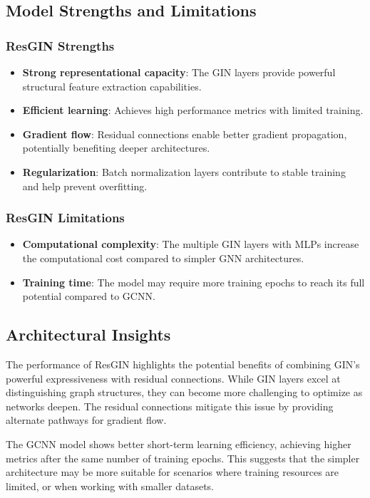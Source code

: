 \documentclass[conference]{IEEEtran}
\begin{document}
\subsection{Model Strengths and Limitations}

\subsubsection{ResGIN Strengths}
\begin{itemize}
    \item \textbf{Strong representational capacity}: The GIN layers provide powerful structural feature extraction capabilities.
    \item \textbf{Efficient learning}: Achieves high performance metrics with limited training.
    \item \textbf{Gradient flow}: Residual connections enable better gradient propagation, potentially benefiting deeper architectures.
    \item \textbf{Regularization}: Batch normalization layers contribute to stable training and help prevent overfitting.
\end{itemize}

\subsubsection{ResGIN Limitations}
\begin{itemize}
    \item \textbf{Computational complexity}: The multiple GIN layers with MLPs increase the computational cost compared to simpler GNN architectures.
    \item \textbf{Training time}: The model may require more training epochs to reach its full potential compared to GCNN.
\end{itemize}

\subsection{Architectural Insights}
The performance of ResGIN highlights the potential benefits of combining GIN's powerful expressiveness with residual connections. While GIN layers excel at distinguishing graph structures, they can become more challenging to optimize as networks deepen. The residual connections mitigate this issue by providing alternate pathways for gradient flow.

The GCNN model shows better short-term learning efficiency, achieving higher metrics after the same number of training epochs. This suggests that the simpler architecture may be more suitable for scenarios where training resources are limited, or when working with smaller datasets.
\end{document}
